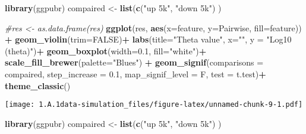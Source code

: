 \documentclass[]{article}
\newenvironment{Shaded}{\begin{snugshade}}{\end{snugshade}}
\newcommand{\CommentTok}[1]{\textcolor[rgb]{0.56,0.35,0.01}{\textit{#1}}}
\newcommand{\DataTypeTok}[1]{\textcolor[rgb]{0.13,0.29,0.53}{#1}}
\newcommand{\FloatTok}[1]{\textcolor[rgb]{0.00,0.00,0.81}{#1}}
\newcommand{\KeywordTok}[1]{\textcolor[rgb]{0.13,0.29,0.53}{\textbf{#1}}}
\newcommand{\NormalTok}[1]{#1}
\newcommand{\OperatorTok}[1]{\textcolor[rgb]{0.81,0.36,0.00}{\textbf{#1}}}
\newcommand{\OtherTok}[1]{\textcolor[rgb]{0.56,0.35,0.01}{#1}}
\newcommand{\StringTok}[1]{\textcolor[rgb]{0.31,0.60,0.02}{#1}}
\begin{document}
\begin{Shaded}
\begin{Highlighting}[]
\KeywordTok{library}\NormalTok{(ggpubr)}
\NormalTok{compaired <-}\StringTok{ }\KeywordTok{list}\NormalTok{(}\KeywordTok{c}\NormalTok{(}\StringTok{"up 5k"}\NormalTok{, }\StringTok{"down 5k"}\NormalTok{) )}

\CommentTok{#res <- as.data.frame(res)}
\KeywordTok{ggplot}\NormalTok{(res, }\KeywordTok{aes}\NormalTok{(}\DataTypeTok{x=}\NormalTok{feature, }\DataTypeTok{y=}\NormalTok{Pairwise, }\DataTypeTok{fill=}\NormalTok{feature)) }\OperatorTok{+}\StringTok{ }
\StringTok{  }\KeywordTok{geom_violin}\NormalTok{(}\DataTypeTok{trim=}\OtherTok{FALSE}\NormalTok{)}\OperatorTok{+}
\StringTok{  }\KeywordTok{labs}\NormalTok{(}\DataTypeTok{title=}\StringTok{"Theta value"}\NormalTok{, }\DataTypeTok{x=}\StringTok{""}\NormalTok{, }\DataTypeTok{y =} \StringTok{"Log10 (theta)"}\NormalTok{)}\OperatorTok{+}
\StringTok{  }\KeywordTok{geom_boxplot}\NormalTok{(}\DataTypeTok{width=}\FloatTok{0.1}\NormalTok{, }\DataTypeTok{fill=}\StringTok{"white"}\NormalTok{)}\OperatorTok{+}
\StringTok{  }\KeywordTok{scale_fill_brewer}\NormalTok{(}\DataTypeTok{palette=}\StringTok{"Blues"}\NormalTok{) }\OperatorTok{+}\StringTok{ }
\StringTok{  }\KeywordTok{geom_signif}\NormalTok{(}\DataTypeTok{comparisons =}\NormalTok{ compaired,}
              \DataTypeTok{step_increase =} \FloatTok{0.1}\NormalTok{,}
              \DataTypeTok{map_signif_level =}\NormalTok{ F,}
              \DataTypeTok{test =}\NormalTok{ t.test)}\OperatorTok{+}
\StringTok{  }\KeywordTok{theme_classic}\NormalTok{()}
\end{Highlighting}
\end{Shaded}

\texttt{[image: 1.A.1data-simulation\_files/figure-latex/unnamed-chunk-9-1.pdf]}

\begin{Shaded}
\begin{Highlighting}[]
\KeywordTok{library}\NormalTok{(ggpubr)}
\NormalTok{compaired <-}\StringTok{ }\KeywordTok{list}\NormalTok{(}\KeywordTok{c}\NormalTok{(}\StringTok{"up 5k"}\NormalTok{, }\StringTok{"down 5k"}\NormalTok{)}
\NormalTok{                  )}
\end{Highlighting}
\end{Shaded}
\end{document}
